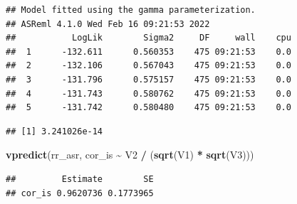 \documentclass[
  12pt,
]{book}
\newenvironment{Shaded}{\begin{snugshade}}{\end{snugshade}}
\newcommand{\DataTypeTok}[1]{\textcolor[rgb]{0.13,0.29,0.53}{#1}}
\newcommand{\DecValTok}[1]{\textcolor[rgb]{0.00,0.00,0.81}{#1}}
\newcommand{\KeywordTok}[1]{\textcolor[rgb]{0.13,0.29,0.53}{\textbf{#1}}}
\newcommand{\NormalTok}[1]{#1}
\newcommand{\OperatorTok}[1]{\textcolor[rgb]{0.81,0.36,0.00}{\textbf{#1}}}
\newcommand{\OtherTok}[1]{\textcolor[rgb]{0.56,0.35,0.01}{#1}}
\newcommand{\StringTok}[1]{\textcolor[rgb]{0.31,0.60,0.02}{#1}}
\begin{document}
\begin{verbatim}
## Model fitted using the gamma parameterization.
## ASReml 4.1.0 Wed Feb 16 09:21:53 2022
##           LogLik        Sigma2     DF     wall    cpu
##  1      -132.611      0.560353    475 09:21:53    0.0
##  2      -132.106      0.567043    475 09:21:53    0.0
##  3      -131.796      0.575157    475 09:21:53    0.0
##  4      -131.743      0.580762    475 09:21:53    0.0
##  5      -131.742      0.580480    475 09:21:53    0.0
\end{verbatim}

\begin{Shaded}
\end{Shaded}

\begin{verbatim}
## [1] 3.241026e-14
\end{verbatim}

\begin{Shaded}
\begin{Highlighting}[]
\KeywordTok{vpredict}\NormalTok{(rr\_asr, cor\_is }\OperatorTok{\textasciitilde{}}\StringTok{ }\NormalTok{V2 }\OperatorTok{/}\StringTok{ }\NormalTok{(}\KeywordTok{sqrt}\NormalTok{(V1) }\OperatorTok{*}\StringTok{ }\KeywordTok{sqrt}\NormalTok{(V3)))}
\end{Highlighting}
\end{Shaded}

\begin{verbatim}
##         Estimate        SE
## cor_is 0.9620736 0.1773965
\end{verbatim}

\begin{Shaded}
\end{Shaded}
\end{document}
